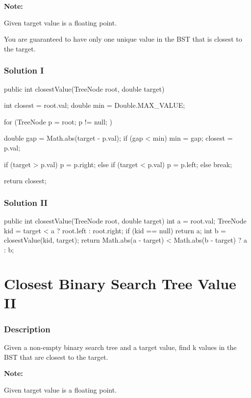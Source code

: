 \textbf{Note:}

Given target value is a floating point.

You are guaranteed to have only one unique value in the BST that is closest to the target.

\subsubsection{Solution I}

\begin{Code}
public int closestValue(TreeNode root, double target) {
    int closest = root.val;
    double min = Double.MAX_VALUE;

    for (TreeNode p = root; p != null; ) {
        double gap = Math.abs(target - p.val);
        if (gap < min) {
            min = gap;
            closest = p.val;
        }

        if (target > p.val) {
            p = p.right;
        } else if (target < p.val) {
            p = p.left;
        } else {
            break;
        }
    }

    return closest;
}
\end{Code}

\subsubsection{Solution II}
\begin{Code}
public int closestValue(TreeNode root, double target) {
    int a = root.val;
    TreeNode kid = target < a ? root.left : root.right;
    if (kid == null) return a;
    int b = closestValue(kid, target);
    return Math.abs(a - target) < Math.abs(b - target) ? a : b;
}
\end{Code}

\newpage

\section{Closest Binary Search Tree Value II} %

\subsubsection{Description}
Given a non-empty binary search tree and a target value, find k values in the BST that are closest to the target.

\textbf{Note:}

Given target value is a floating point.

